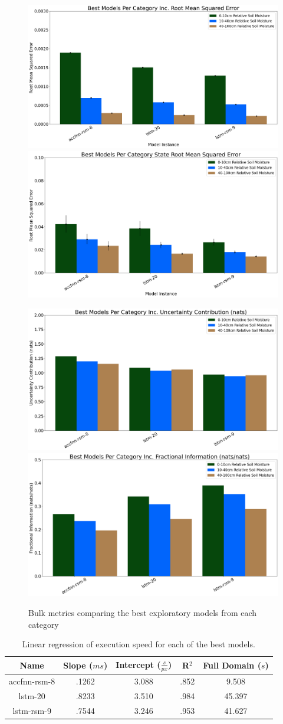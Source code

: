 \begin{figure}[hp!]
    \includegraphics[width=.48\linewidth,draft=false]{figures/efficiency_initial-best/eval_test_efficiency_initial-best_mse_res.png}
    \includegraphics[width=.48\linewidth,draft=false]{figures/efficiency_initial-best/eval_test_efficiency_initial-best_mse_state.png}

    \includegraphics[width=.48\linewidth,draft=false]{figures/efficiency_initial-best/eval_test_efficiency_initial-best_info-loss_res.png}
    \includegraphics[width=.48\linewidth,draft=false]{figures/efficiency_initial-best/eval_test_efficiency_initial-best_fi_res.png}

    \caption{Bulk metrics comparing the best exploratory models from each category}
    \label{best-metrics}
\end{figure}

\begin{table}[H]
    \centering
    \begin{tabular}{c|c|c|c|c }
        Name & Slope ($ms$) & Intercept ($\frac{s}{px}$) & R$^2$ & Full Domain ($s$) \\
        \hline
        accfnn-rsm-8 & .1262 & 3.088 & .852 & 9.508 \\
        lstm-20 & .8233 & 3.510 & .984 & 45.397 \\
        lstm-rsm-9 & .7544 & 3.246 & .953 & 41.627 \\
    \end{tabular}
    \label{best-exec-efficiency-table}
    \caption{Linear regression of execution speed for each of the best models.}
\end{table}

